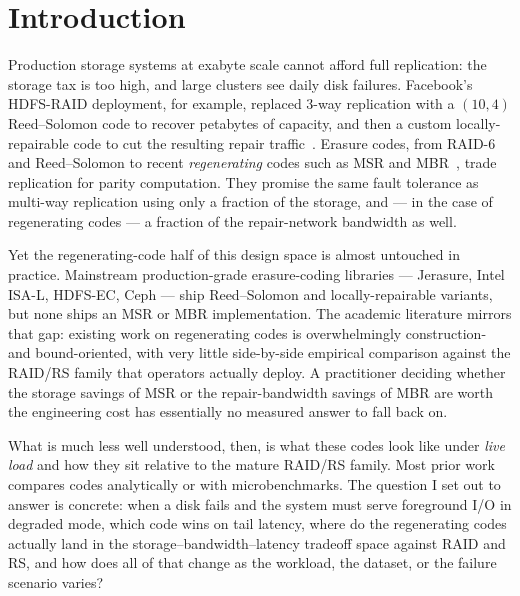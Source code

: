 \documentclass[letterpaper,twocolumn,10pt]{article}
\begin{document}
\section{Introduction}
\label{sec:intro}

Production storage systems at exabyte scale cannot afford full replication:
the storage tax is too high, and large clusters see daily disk failures.
Facebook's HDFS-RAID deployment, for example, replaced 3-way replication
with a $(10,4)$ Reed--Solomon code to recover petabytes of capacity, and
then a custom locally-repairable code to cut the resulting repair
traffic~\cite{sathiamoorthy13}.
Erasure codes, from RAID-6 and Reed--Solomon to recent
\emph{regenerating} codes such as MSR and MBR~\cite{dimakis10,rashmi11},
trade replication for parity computation. They promise the same fault
tolerance as multi-way replication using only a fraction of the storage,
and --- in the case of regenerating codes --- a fraction of the
repair-network bandwidth as well.

Yet the regenerating-code half of this design space is almost untouched in
practice. Mainstream production-grade erasure-coding libraries ---
Jerasure, Intel ISA-L, HDFS-EC, Ceph --- ship Reed--Solomon and
locally-repairable variants, but none ships an MSR or MBR implementation.
The academic literature mirrors that gap: existing work on regenerating
codes is overwhelmingly construction- and bound-oriented, with very little
side-by-side empirical comparison against the RAID/RS family that operators
actually deploy. A practitioner deciding whether the storage savings of MSR
or the repair-bandwidth savings of MBR are worth the engineering cost has
essentially no measured answer to fall back on.

What is much less well understood, then, is what these codes look like under
\emph{live load} and how they sit relative to the mature RAID/RS family.
Most prior work compares codes analytically or with microbenchmarks. The
question I set out to answer is concrete: when a disk fails and the system
must serve foreground I/O in degraded mode, which code wins on tail
latency, where do the regenerating codes actually land in the
storage--bandwidth--latency tradeoff space against RAID and RS, and how
does all of that change as the workload, the dataset, or the failure
scenario varies?
\end{document}
